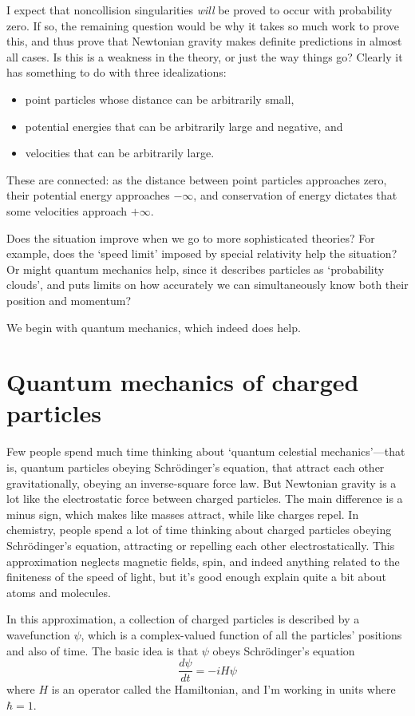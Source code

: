\documentclass{article}
\begin{document}
I expect that noncollision singularities \emph{will} be proved to occur with probability zero.  If so, the remaining question would be why it takes so much work to prove this, and thus prove that Newtonian gravity makes definite predictions in almost all cases.  Is this is a weakness in the theory, or just the way things go?   Clearly it has something to do with three idealizations:
\begin{itemize} 
\item point particles whose distance can be arbitrarily small,
\item potential energies that can be arbitrarily large and negative, and 
\item velocities that can be arbitrarily large.
\end{itemize}  
These are connected: as the distance between point particles approaches zero, their potential energy approaches $-\infty$, and conservation of energy dictates that some velocities approach $+\infty$.  

Does the situation improve when we go to more sophisticated theories?  For example, does the `speed limit' imposed by special relativity help the situation?  Or might quantum mechanics help, since it describes particles as `probability clouds', and puts limits on how accurately we can simultaneously know both their position and momentum?

We begin with quantum mechanics, which indeed does help.

\section{Quantum mechanics of charged particles}
\label{quantum}

Few people spend much time thinking about `quantum celestial mechanics'---that is, quantum particles obeying Schr\"odinger's equation, that attract each other gravitationally, obeying an inverse-square force law.   But Newtonian gravity is a lot like the electrostatic force between charged particles.  The main difference is a minus sign, which makes like masses attract, while like charges repel.  In chemistry, people spend a lot of time thinking about charged particles obeying Schr\"odinger's equation, attracting or repelling each other electrostatically.  This approximation neglects magnetic fields, spin, and indeed anything related to the finiteness of the speed of light, but it's good enough explain quite a bit about atoms and molecules.

In this approximation, a collection of charged particles is described by a 
wavefunction $\psi$, which is a complex-valued function of all the particles' positions 
and also of time.   The basic idea is that $\psi$ obeys Schr\"odinger's
equation
\[ \frac{d \psi}{dt} = - i H \psi \]
where $H$ is an operator called the Hamiltonian, and I'm working in units where $\hbar = 1$.  
\end{document}
